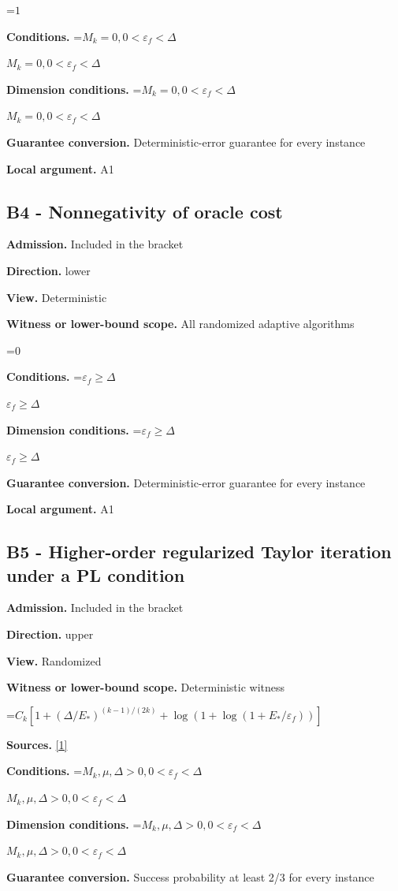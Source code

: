 \documentclass[10pt,a4paper]{article}
\newcommand{\AtlasMath}[1]{\par\begingroup\centering\setbox0=\hbox{$\displaystyle #1$}\ifdim\wd0>1.4\linewidth\typeout{ATLAS WIDE FORMULA: \the\wd0}\fi\ifdim\wd0>\linewidth\resizebox{\linewidth}{!}{\box0}\else\box0\fi\par\endgroup}
\newcommand{\AtlasInlineMath}[1]{\begingroup\setbox0=\hbox{$#1$}\ifdim\wd0>.4\linewidth\endgroup\AtlasMath{#1}\else\endgroup$#1$\fi}
\begin{document}
\AtlasMath{1}
\textbf{Conditions.} \AtlasInlineMath{M_k=0,0<\varepsilon_f<\Delta}

\textbf{Dimension conditions.} \AtlasInlineMath{M_k=0,0<\varepsilon_f<\Delta}

\textbf{Guarantee conversion.} Deterministic-error guarantee for every instance

\textbf{Local argument.} A1

\subsection{B4 - Nonnegativity of oracle cost}
\textbf{Admission.} Included in the bracket

\textbf{Direction.} lower

\textbf{View.} Deterministic

\textbf{Witness or lower-bound scope.} All randomized adaptive algorithms

\AtlasMath{0}
\textbf{Conditions.} \AtlasInlineMath{\varepsilon_f\ge \Delta}

\textbf{Dimension conditions.} \AtlasInlineMath{\varepsilon_f\ge \Delta}

\textbf{Guarantee conversion.} Deterministic-error guarantee for every instance

\textbf{Local argument.} A1

\subsection{B5 - Higher-order regularized Taylor iteration under a PL condition}
\textbf{Admission.} Included in the bracket

\textbf{Direction.} upper

\textbf{View.} Randomized

\textbf{Witness or lower-bound scope.} Deterministic witness

\AtlasMath{C_k[1+(\Delta/E_*)^{(k-1)/(2k)}+\log(1+\log(1+E_*/\varepsilon_f))]}
\textbf{Sources.} \href{https://optimization-online.org/wp-content/uploads/2015/06/4970.pdf}{[1]}

\textbf{Conditions.} \AtlasInlineMath{M_k,\mu,\Delta>0,0<\varepsilon_f<\Delta}

\textbf{Dimension conditions.} \AtlasInlineMath{M_k,\mu,\Delta>0,0<\varepsilon_f<\Delta}

\textbf{Guarantee conversion.} Success probability at least 2/3 for every instance
\end{document}
